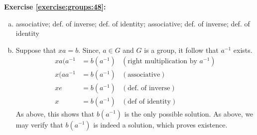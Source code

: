 \noindent\textbf{Exercise \ref{exercise:groups:48}:} 
\begin{enumerate}[(a)]
\item 
%
%
% 
%
%
associative;  	def. of inverse;  def. of identity; associative; def. of inverse; def. of identity
\item
Suppose that $xa = b$. Since, $a \in G$ and $G$ is a group, it follow that $a^{-1}$ exists.\\
\begin{align*}
xa(a^{-1} &= b(a^{-1})	& (\text{right multiplication by $a^{-1}$})\\
x(aa^{-1} &= b(a^{-1})	& (\text{associative})\\
xe &= b(a^{-1})	& (\text{def. of inverse})\\
x &= b(a^{-1})	& (\text{def of identity})
\end{align*}
As above, this shows that $b (a^{-1})$ is the only possible solution. As above, we may verify that $b (a^{-1})$ is indeed a solution, which proves existence.
\end{enumerate}

